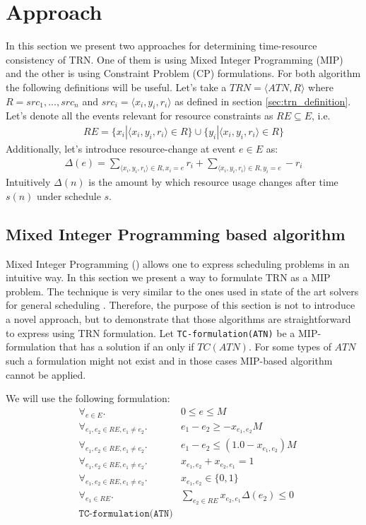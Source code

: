 \section{Approach}
In this section we present two approaches for determining time-resource consistency of TRN. One of them is using Mixed Integer Programming (MIP) and the other is using Constraint Problem (CP) formulations. For both algorithm the following definitions will be useful.
Let's take a $TRN=\langle ATN, R \rangle$ where $R={src_1, ..., src_n}$ and $src_i = \langle x_i, y_i, r_i \rangle$ as defined in section \ref{sec:trn_definition}. Let's denote all the events relevant for resource constraints as $RE \subseteq E$, i.e.
\begin{align*}
RE = \{ x_i | \langle x_i, y_i, r_i \rangle \in R \} \cup \{ y_i | \langle x_i, y_i, r_i \rangle \in R \}
\end{align*}
Additionally, let's introduce resource-change at event $e \in E$ as:
\begin{align*}
\Delta(e) = \sum_{\langle x_i, y_i, r_i \rangle \in R, x_i = e} r_i + \sum_{ \langle x_i, y_i, r_i \rangle \in R, y_i = e} -r_i
\end{align*}
Intuitively $\Delta(n)$ is the amount by which resource usage changes after time $s(n)$ under schedule $s$.

\subsection{Mixed Integer Programming based algorithm}
Mixed Integer Programming (\cite{markowitz1957solution}) allows one to express scheduling problems in an intuitive way. In this section we present a way to formulate TRN as a MIP problem. The technique is very similar to the ones used in state of the art solvers for general scheduling  \cite{patterson1984comparison} \cite{bartusch1988scheduling}. Therefore, the purpose of this section is not to introduce a novel approach, but to demonstrate that those algorithms are straightforward to express using TRN formulation. Let \texttt{TC-formulation(ATN)} be a MIP-formulation that has a solution if an only if $TC(ATN)$. For some types of $ATN$ such a formulation might not exist and in those cases MIP-based algorithm cannot be applied.

We will use the following formulation:
\begin{align}
\label{eq:mip0} & \forall_{e \in E}.              & 0 \leq e \leq M \\
\label{eq:mip1} & \forall_{e_1, e_2 \in RE, e_1 \neq e_2}. & e_1 - e_2 \geq - x_{e_1,e_2} M \\
\label{eq:mip2} & \forall_{e_1, e_2 \in RE, e_1 \neq e_2}. & e_1 - e_2 \leq (1.0 - x_{e_1,e_2}) M\\
\label{eq:mip3} & \forall_{e_1, e_2 \in RE, e_1 \neq e_2}. & x_{e_1,e_2} + x_{e_2,e_1}  = 1\\
\label{eq:mip4} & \forall_{e_1, e_2 \in RE, e_1 \neq e_2}. & x_{e_1,e_2} \in \{ 0, 1 \} \\
\label{eq:mip5} & \forall_{e_1 \in RE}.                    & \sum_{e_2 \in RE} x_{e_2, e_1} \Delta(e_2) \leq 0\\
\label{eq:mip6} & \texttt{TC-formulation(ATN)}
\end{align}

